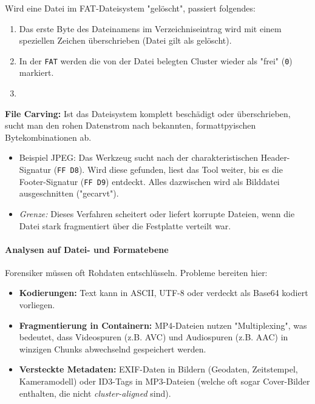 \documentclass[
../../css_summary.tex,
]{subfiles}
\begin{document}
\begin{defbox}
  Wird eine Datei im FAT-Dateisystem "gelöscht", passiert folgendes:
  \begin{enumerate}
    \item Das erste Byte des Dateinamens im Verzeichniseintrag wird mit einem speziellen Zeichen überschrieben (Datei gilt als gelöscht).
    \item In der \texttt{FAT} werden die von der Datei belegten Cluster wieder als "frei" (\texttt{0}) markiert.
    \item {}
  \end{enumerate}

  \textbf{File Carving:} Ist das Dateisystem komplett beschädigt oder überschrieben, sucht man den rohen Datenstrom nach bekannten, formattpyischen Bytekombinationen ab.
  \begin{itemize}
    \item Beispiel JPEG: Das Werkzeug sucht nach der charakteristischen Header-Signatur (\texttt{FF D8}). Wird diese gefunden, liest das Tool weiter, bis es die Footer-Signatur (\texttt{FF D9}) entdeckt. Alles dazwischen wird als Bilddatei ausgeschnitten ("gecarvt").
    \item \textit{Grenze:} Dieses Verfahren scheitert oder liefert korrupte Dateien, wenn die Datei stark fragmentiert über die Festplatte verteilt war.
  \end{itemize}
\end{defbox}

\paragraph{Analysen auf Datei- und Formatebene}
Forensiker müssen oft Rohdaten entschlüsseln. Probleme bereiten hier:
\begin{itemize}
  \item \textbf{Kodierungen:} Text kann in ASCII, UTF-8 oder verdeckt als Base64 kodiert vorliegen.
  \item \textbf{Fragmentierung in Containern:} MP4-Dateien nutzen "Multiplexing", was bedeutet, dass Videospuren (z.B. AVC) und Audiospuren (z.B. AAC) in winzigen Chunks abwechselnd gespeichert werden.
  \item \textbf{Versteckte Metadaten:} EXIF-Daten in Bildern (Geodaten, Zeitstempel, Kameramodell) oder ID3-Tags in MP3-Dateien (welche oft sogar Cover-Bilder enthalten, die nicht \textit{cluster-aligned} sind).
\end{itemize}
\end{document}
